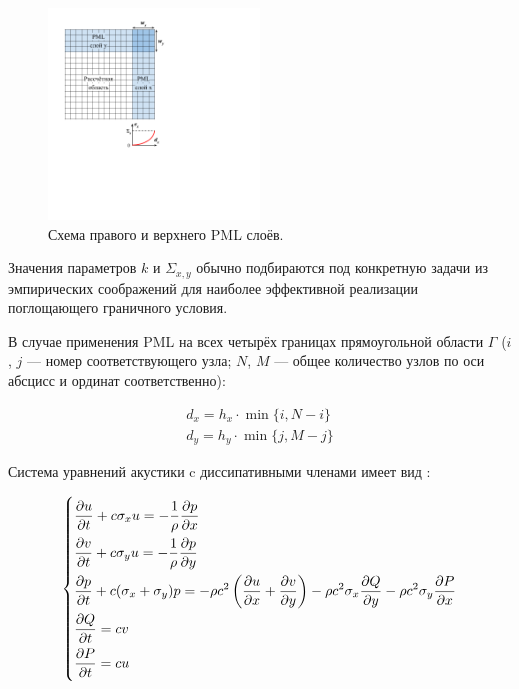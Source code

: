 \begin{figure}[H]
    \centering
    \includegraphics[trim={72pt 325pt 430pt 55pt},clip,width=0.5\textwidth]{images/pml/pml_scheme.png}
    \caption{Схема правого и верхнего PML слоёв.}
    \label{fig:pml_scheme}
\end{figure}

Значения параметров $k$ и $\Sigma_{x,y}$ обычно подбираются под конкретную задачи из эмпирических соображений для наиболее эффективной реализации поглощающего граничного условия.

В случае применения PML на всех четырёх границах прямоугольной области $\Gamma$ ($i$, $j$ --- номер соответствующего узла; $N$, $M$ --- общее количество узлов по оси абсцисс и ординат соответственно):
    
\begin{gather}
	d_x = h_x \cdot \min\{i, N - i\} \\
	d_y = h_y \cdot \min\{j, M - j\}  
\end{gather}
    
Система уравнений акустики c диссипативными членами имеет вид \cite{pml-wave}:
    
\begin{equation}
	\begin{dcases}
		\frac{\partial u}{\partial t} + c\sigma_x u = -\frac{1}{\rho}\frac{\partial p}{\partial x} \\
		\frac{\partial v}{\partial t} + c\sigma_y u = -\frac{1}{\rho}\frac{\partial p}{\partial y} \\
	    \frac{\partial p}{\partial t} + c(\sigma_x + \sigma_y) p = -\rho c^2 \left(\frac{\partial u}{\partial x}+\frac{\partial v}{\partial y}\right) - \rho c^2 \sigma_x \frac{\partial Q}{\partial y} - \rho c^2 \sigma_y \frac{\partial P}{\partial x} \\
	    \frac{\partial Q}{\partial t} = cv \\
	    \frac{\partial P}{\partial t} = cu
	\end{dcases}\label{eq:pml} 
\end{equation}
    
